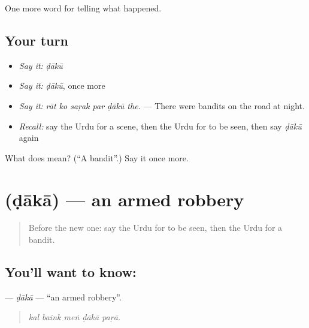 \begin{grammarlens}[title={What you've built}]
One more word for telling what happened.
\end{grammarlens}

\subsection*{Your turn}
\begin{itemize}
\raggedright
  \item \emph{Say it:} \emph{ḍākū}
  \item \emph{Say it:} \emph{ḍākū}, once more
  \item \emph{Say it:} \emph{rāt ko saṛak par ḍākū the.} — There were bandits on the road at night.
  \item \emph{Recall:} say the Urdu for a scene, then the Urdu for to be seen, then say \emph{ḍākū} again
\end{itemize}

\begin{tcolorbox}[breakable,colback=teal!4,colframe=teal!35!black,title={Before you move on}]
What does  mean? (\textquotedblleft{}A bandit\textquotedblright{}.) Say it once more.
\end{tcolorbox}
\section[\texorpdfstring{\ur{ڈاکہ} (ḍākā)}{ڈاکہ (ḍākā)}]{ (ḍākā) — an armed robbery}

\label{lesson:UR-C280-daka}



\begin{quote}
Before the new one: say the Urdu for to be seen, then the Urdu for a bandit.
\end{quote}

\subsection*{You'll want to know: }
\textbf{} — \emph{ḍākā} — \textquotedblleft{}an armed robbery\textquotedblright{}.

\begin{quote}
    
\end{quote}

\begin{quote}
\emph{kal baink meṅ ḍākā paṛā.}
\end{quote}

